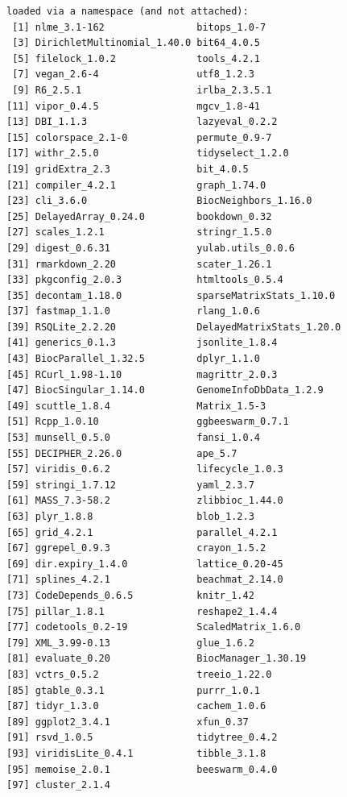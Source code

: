 \documentclass[
]{book}
\begin{document}
\begin{verbatim}
loaded via a namespace (and not attached):
 [1] nlme_3.1-162                bitops_1.0-7               
 [3] DirichletMultinomial_1.40.0 bit64_4.0.5                
 [5] filelock_1.0.2              tools_4.2.1                
 [7] vegan_2.6-4                 utf8_1.2.3                 
 [9] R6_2.5.1                    irlba_2.3.5.1              
[11] vipor_0.4.5                 mgcv_1.8-41                
[13] DBI_1.1.3                   lazyeval_0.2.2             
[15] colorspace_2.1-0            permute_0.9-7              
[17] withr_2.5.0                 tidyselect_1.2.0           
[19] gridExtra_2.3               bit_4.0.5                  
[21] compiler_4.2.1              graph_1.74.0               
[23] cli_3.6.0                   BiocNeighbors_1.16.0       
[25] DelayedArray_0.24.0         bookdown_0.32              
[27] scales_1.2.1                stringr_1.5.0              
[29] digest_0.6.31               yulab.utils_0.0.6          
[31] rmarkdown_2.20              scater_1.26.1              
[33] pkgconfig_2.0.3             htmltools_0.5.4            
[35] decontam_1.18.0             sparseMatrixStats_1.10.0   
[37] fastmap_1.1.0               rlang_1.0.6                
[39] RSQLite_2.2.20              DelayedMatrixStats_1.20.0  
[41] generics_0.1.3              jsonlite_1.8.4             
[43] BiocParallel_1.32.5         dplyr_1.1.0                
[45] RCurl_1.98-1.10             magrittr_2.0.3             
[47] BiocSingular_1.14.0         GenomeInfoDbData_1.2.9     
[49] scuttle_1.8.4               Matrix_1.5-3               
[51] Rcpp_1.0.10                 ggbeeswarm_0.7.1           
[53] munsell_0.5.0               fansi_1.0.4                
[55] DECIPHER_2.26.0             ape_5.7                    
[57] viridis_0.6.2               lifecycle_1.0.3            
[59] stringi_1.7.12              yaml_2.3.7                 
[61] MASS_7.3-58.2               zlibbioc_1.44.0            
[63] plyr_1.8.8                  blob_1.2.3                 
[65] grid_4.2.1                  parallel_4.2.1             
[67] ggrepel_0.9.3               crayon_1.5.2               
[69] dir.expiry_1.4.0            lattice_0.20-45            
[71] splines_4.2.1               beachmat_2.14.0            
[73] CodeDepends_0.6.5           knitr_1.42                 
[75] pillar_1.8.1                reshape2_1.4.4             
[77] codetools_0.2-19            ScaledMatrix_1.6.0         
[79] XML_3.99-0.13               glue_1.6.2                 
[81] evaluate_0.20               BiocManager_1.30.19        
[83] vctrs_0.5.2                 treeio_1.22.0              
[85] gtable_0.3.1                purrr_1.0.1                
[87] tidyr_1.3.0                 cachem_1.0.6               
[89] ggplot2_3.4.1               xfun_0.37                  
[91] rsvd_1.0.5                  tidytree_0.4.2             
[93] viridisLite_0.4.1           tibble_3.1.8               
[95] memoise_2.0.1               beeswarm_0.4.0             
[97] cluster_2.1.4              
\end{verbatim}
\end{document}
